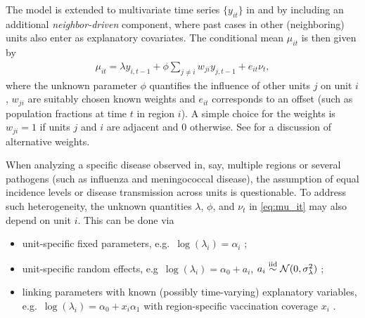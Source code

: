 \documentclass[a4paper,11pt]{article}
\newcommand{\n}{{\cal N}}
\begin{document}
The model is extended to multivariate time series $\{y_{it}\}$ in 
\cite{held-etal-2005} and \cite{paul-etal-2008} by including an additional 
\emph{neighbor-driven} component, where past cases in other (neighboring) 
units also enter as explanatory covariates. The conditional mean $\mu_{it}$ 
is then given by
\begin{align} \label{eq:mu_it}
  \mu_{it} = \lambda y_{i,t-1} + \phi \sum_{j\neq i} w_{ji} y_{j,t-1} +e_{it} \nu_{t},
\end{align}
where the unknown parameter $\phi$ quantifies the influence of other units $j$ 
on unit $i$, $w_{ji}$ are suitably chosen known weights and $e_{it}$
corresponds to an offset (such as population fractions at time $t$ in region $i$).
A simple choice for the weights is $w_{ji}=1$ if units $j$ and $i$ are adjacent
and 0 otherwise. See \cite{paul-etal-2008} for a discussion of alternative
weights.

When analyzing a specific disease observed in, say, multiple regions or several
pathogens (such as influenza and meningococcal disease), the assumption
of equal incidence levels or disease transmission across units is
questionable. To address such heterogeneity, the unknown quantities
$\lambda$, $\phi$, and $\nu_t$ in \eqref{eq:mu_it} may also depend on unit
$i$. This can be done via
\begin{itemize}
  \item unit-specific fixed parameters, e.g.\ $\log(\lambda_i)=\alpha_i$ 
     \citep{paul-etal-2008};
  \item unit-specific random effects, e.g\ $\log(\lambda_i)=\alpha_0 +a_i$, 
     $a_i \stackrel{\text{iid}}{\sim} \n(0,\sigma^2_\lambda)$ \citep{paul-held-2010};
  \item linking parameters with known (possibly time-varying) explanatory 
     variables, e.g.\ $\log(\lambda_i)=\alpha_0 +x_i\alpha_1$ with
     region-specific vaccination coverage $x_i$ \citep{herzog-etal-2010}.
\end{itemize}
\end{document}

